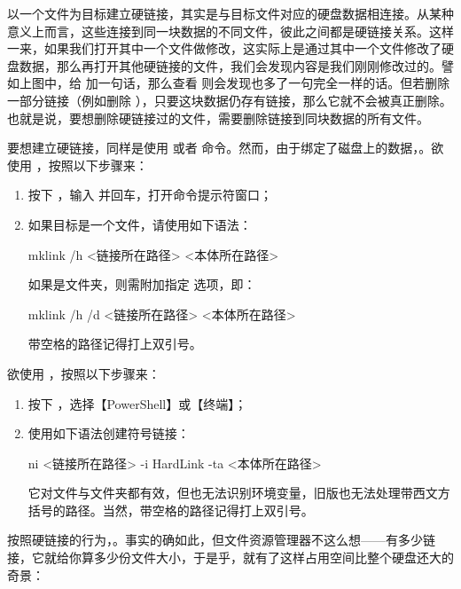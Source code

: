 {{{{以一个文件为目标建立硬链接，其实是与目标文件对应的硬盘数据相连接。从某种意义上而言，这些连接到同一块数据的不同文件，彼此之间都是硬链接关系。这样一来，如果我们打开其中一个文件做修改，这实际上是通过其中一个文件修改了硬盘数据，那么再打开其他硬链接的文件，我们会发现内容是我们刚刚修改过的。譬如上图中，给  加一句话，那么查看  则会发现也多了一句完全一样的话。但若删除一部分链接（例如删除 ），只要这块数据仍存有链接，那么它就不会被真正删除。也就是说，要想删除硬链接过的文件，需要删除链接到同块数据的所有文件。

要想建立硬链接，同样是使用  或者  命令。然而，由于绑定了磁盘上的数据，。欲使用 ，按照以下步骤来：

\begin{enumerate}
  \item 按下 ，输入  并回车，打开命令提示符窗口；
  \item 如果目标是一个文件，请使用如下语法：
    \begin{MissingVerbatim}[bat]
      mklink /h <链接所在路径> <本体所在路径>
    \end{MissingVerbatim}
    如果是文件夹，则需附加指定  选项，即：
    \begin{MissingVerbatim}[bat]
      mklink /h /d <链接所在路径> <本体所在路径>
    \end{MissingVerbatim}
    带空格的路径记得打上双引号。
\end{enumerate}

欲使用 ，按照以下步骤来：

\begin{enumerate}
  \item 按下 ，选择【PowerShell】或【终端】；
  \item 使用如下语法创建符号链接：
    \begin{MissingVerbatim}[pwsh]
      ni <链接所在路径> -i HardLink -ta <本体所在路径>
    \end{MissingVerbatim}
    它对文件与文件夹都有效，但也无法识别环境变量，旧版也无法处理带西文方括号的路径。当然，带空格的路径记得打上双引号。
\end{enumerate}

按照硬链接的行为，。事实的确如此，但文件资源管理器不这么想——有多少链接，它就给你算多少份文件大小，于是乎，就有了这样占用空间比整个硬盘还大的奇景：

}}}}
